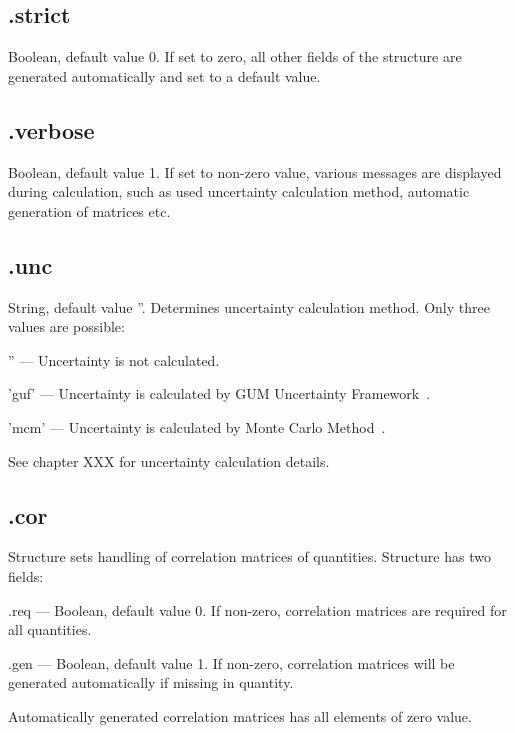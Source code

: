 \documentclass[12pt,a4paper,oneside]{report} %
\begin{document}
\subsection{\textsf{.strict}} %
Boolean, default value 0. If set to zero, all other fields of the structure are generated
automatically and set to a default value.

\subsection{\textsf{.verbose}} %
Boolean, default value 1. If set to non-zero value, various messages are displayed during
calculation, such as used uncertainty calculation method, automatic generation of matrices etc.

\subsection{\textsf{.unc}} %
String, default value ''. Determines uncertainty calculation method. Only three values are possible:
\begin{tightdesc}
        \item [\textsf{''}] ---  Uncertainty is not calculated.
        \item [\textsf{'guf'}] ---  Uncertainty is calculated by GUM Uncertainty Framework~\cite{JCGM1995}.
        \item [\textsf{'mcm'}] ---  Uncertainty is calculated by Monte Carlo Method~\cite{JCGM2008}.
\end{tightdesc}
See chapter XXX %
for uncertainty calculation details.

\subsection{\textsf{.cor}} %
Structure sets handling of correlation matrices of quantities. Structure has two fields:
\begin{tightdesc}
        \item [\textsf{.req}] ---  Boolean, default value 0. If non-zero, correlation matrices are required for all quantities.
        \item [\textsf{.gen}] ---  Boolean, default value 1. If non-zero, correlation matrices will be generated
        automatically if missing in quantity.
\end{tightdesc}
Automatically generated correlation matrices has all elements of zero value.
\end{document}

